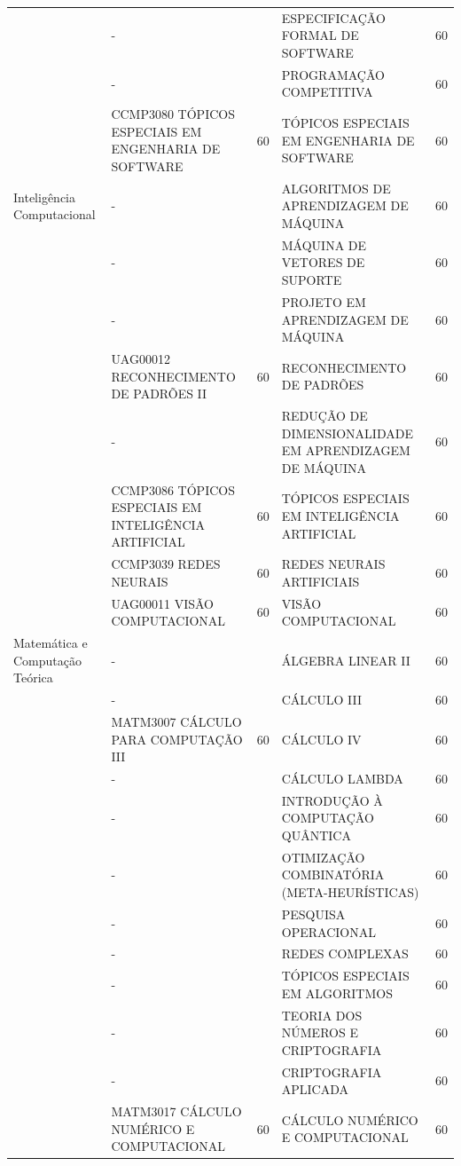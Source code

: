 \begin{center}
\begin{tiny}
\begin{longtable}{p{2cm}p{5.4cm}cp{5.4cm}c}
    & - & & ESPECIFICAÇÃO FORMAL DE SOFTWARE & 60 \\ \cline{2-5}
    & - & & PROGRAMAÇÃO COMPETITIVA & 60 \\ \cline{2-5}
    & CCMP3080 TÓPICOS ESPECIAIS EM ENGENHARIA DE SOFTWARE & 60 & TÓPICOS ESPECIAIS EM ENGENHARIA DE SOFTWARE & 60 \\ \midrule
  Inteligência Computacional & - & & ALGORITMOS DE APRENDIZAGEM DE MÁQUINA & 60 \\ \cline{2-5}
    & - & & MÁQUINA DE VETORES DE SUPORTE & 60 \\ \cline{2-5}
    & - & & PROJETO EM APRENDIZAGEM DE MÁQUINA & 60 \\ \cline{2-5}
    & UAG00012 RECONHECIMENTO DE PADRÕES II & 60 & RECONHECIMENTO DE PADRÕES & 60 \\ \cline{2-5}
    & - & & REDUÇÃO DE DIMENSIONALIDADE EM APRENDIZAGEM DE MÁQUINA & 60 \\ \cline{2-5}
    & CCMP3086 TÓPICOS ESPECIAIS EM INTELIGÊNCIA ARTIFICIAL & 60 & TÓPICOS ESPECIAIS EM INTELIGÊNCIA ARTIFICIAL & 60 \\ \cline{2-5}
    & CCMP3039 REDES NEURAIS & 60 & REDES NEURAIS ARTIFICIAIS & 60 \\ \cline{2-5}
    & UAG00011 VISÃO COMPUTACIONAL & 60 & VISÃO COMPUTACIONAL & 60 \\ \midrule
  Matemática e Computação Teórica & - & & ÁLGEBRA LINEAR II & 60 \\ \cline{2-5}
    & - & & CÁLCULO III & 60 \\ \cline{2-5}
    & MATM3007 CÁLCULO PARA COMPUTAÇÃO III & 60 & CÁLCULO IV & 60 \\ \cline{2-5}
    & - & & CÁLCULO LAMBDA & 60 \\ \cline{2-5}
    & - & & INTRODUÇÃO À COMPUTAÇÃO QUÂNTICA  & 60 \\ \cline{2-5}
    & - & & OTIMIZAÇÃO COMBINATÓRIA (META-HEURÍSTICAS) & 60 \\ \cline{2-5}
    & - & & PESQUISA OPERACIONAL & 60 \\ \cline{2-5}
    & - & & REDES COMPLEXAS & 60 \\ \cline{2-5}
    & - & & TÓPICOS ESPECIAIS EM ALGORITMOS & 60 \\ \cline{2-5}
    & - & & TEORIA DOS NÚMEROS E CRIPTOGRAFIA & 60 \\ \cline{2-5}
    & - & & CRIPTOGRAFIA APLICADA & 60 \\ \cline{2-5}
    & MATM3017 CÁLCULO NUMÉRICO E COMPUTACIONAL & 60 & CÁLCULO NUMÉRICO E COMPUTACIONAL & 60 \\ \cline{2-5}

\end{longtable}
\end{tiny}
\end{center}
